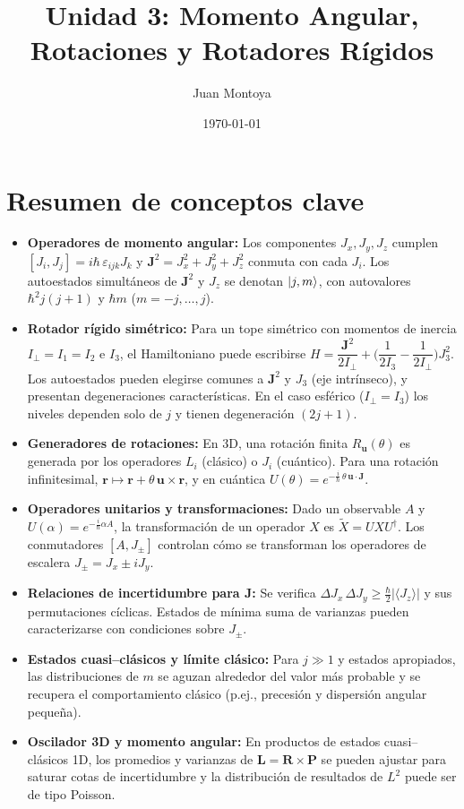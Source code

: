 \documentclass[a4paper,11pt]{article}
\title{Unidad 3: Momento Angular, Rotaciones y Rotadores Rígidos}
\author{Juan Montoya}
\date{\today}
\begin{document}
\maketitle

\section*{Resumen de conceptos clave}
\begin{itemize}
	\item \textbf{Operadores de momento angular:} Los componentes $J_x,J_y,J_z$ cumplen
	$[J_i,J_j]=i\hbar\,\varepsilon_{ijk}J_k$ y $\mathbf{J}^2=J_x^2+J_y^2+J_z^2$ conmuta con cada $J_i$.
	Los autoestados simultáneos de $\mathbf{J}^2$ y $J_z$ se denotan $\ket{j,m}$, con
	autovalores $\hbar^2 j(j+1)$ y $\hbar m$ ($m=-j,\dots,j$).

	\item \textbf{Rotador rígido simétrico:} Para un tope simétrico con momentos de inercia $I_\perp=I_1=I_2$ e $I_3$,
	el Hamiltoniano puede escribirse $H=\dfrac{\mathbf{J}^2}{2I_\perp}+\Big(\dfrac{1}{2I_3}-\dfrac{1}{2I_\perp}\Big)J_3^2$.
	Los autoestados pueden elegirse comunes a $\mathbf{J}^2$ y $J_3$ (eje intrínseco), y presentan degeneraciones características.
	En el caso esférico ($I_\perp=I_3$) los niveles dependen solo de $j$ y tienen degeneración $(2j+1)$.

	\item \textbf{Generadores de rotaciones:} En 3D, una rotación finita $R_{\mathbf{u}}(\theta)$ es generada por los
	operadores $L_i$ (clásico) o $J_i$ (cuántico). Para una rotación infinitesimal, $\mathbf{r}\mapsto \mathbf{r}+\theta\,\mathbf{u}\times\mathbf{r}$,
	y en cuántica $U(\theta)=e^{-\tfrac{i}{\hbar}\,\theta\,\mathbf{u}\cdot\mathbf{J}}$.

	\item \textbf{Operadores unitarios y transformaciones:} Dado un observable $A$ y $U(\alpha)=e^{-\tfrac{i}{\hbar}\alpha A}$, la transformación de un operador $X$ es $\tilde X=U X U^{\dagger}$.
	Los conmutadores $[A,J_\pm]$ controlan cómo se transforman los operadores de escalera $J_\pm=J_x\pm iJ_y$.

	\item \textbf{Relaciones de incertidumbre para $\mathbf{J}$:} Se verifica $\Delta J_x\,\Delta J_y\ge \tfrac{\hbar}{2}|\langle J_z\rangle|$ y sus permutaciones cíclicas.
	Estados de mínima suma de varianzas pueden caracterizarse con condiciones sobre $J_\pm$.

	\item \textbf{Estados cuasi–clásicos y límite clásico:} Para $j\gg 1$ y estados apropiados, las distribuciones de $m$ se aguzan
	alrededor del valor más probable y se recupera el comportamiento clásico (p.ej., precesión y dispersión angular pequeña).

	\item \textbf{Oscilador 3D y momento angular:} En productos de estados cuasi–clásicos 1D, los promedios y varianzas de $\mathbf{L}=\mathbf{R}\times\mathbf{P}$
	se pueden ajustar para saturar cotas de incertidumbre y la distribución de resultados de $L^2$ puede ser de tipo Poisson.
\end{itemize}
\end{document}
